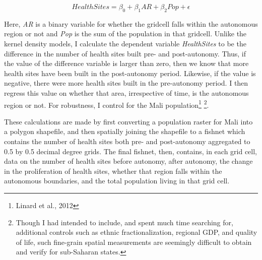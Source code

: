 \documentclass[12pt]{elsarticle}
\begin{document}
\begin{equation}
\label{eq:emc}
Health Sites = \beta_0 + \beta_1 AR + \beta_2 Pop + \epsilon
\end{equation}

Here, \textit{AR} is a binary variable for whether the gridcell falls within the autonomous region or not and \textit{Pop} is the sum of the population in that gridcell. Unlike the kernel density models, I calculate the dependent variable \textit{HealthSites} to be the difference in the number of health sites built pre- and post-autonomy. Thus, if the value of the difference variable is larger than zero, then we know that more health sites have been built in the post-autonomy period. Likewise, if the value is negative, there were more health sites built in the pre-autonomy period. I then regress this value on whether that area, irrespective of time, is the autonomous region or not. For robustness, I control for the Mali population\footnote{Linard et al., 2012} \footnote{Though I had intended to include, and spent much time searching for, additional controls such as ethnic fractionalization, regional GDP, and quality of life, such fine-grain spatial measurements are seemingly difficult to obtain and verify for sub-Saharan states.}. 

These calculations are made by first converting a population raster for Mali into a polygon shapefile, and then spatially joining the shapefile to a fishnet which contains the number of health sites both pre- and post-autonomy aggregated to 0.5 by 0.5 decimal degree grids. The final fishnet, then, contains, in each grid cell, data on the number of health sites before autonomy, after autonomy, the change in the proliferation of health sites, whether that region falls within the autonomous boundaries, and the total population living in that grid cell. 

\begin{table}
    \small
\begin{center}
\end{center}
\caption{OLS Results}
\end{table}
\end{document}
